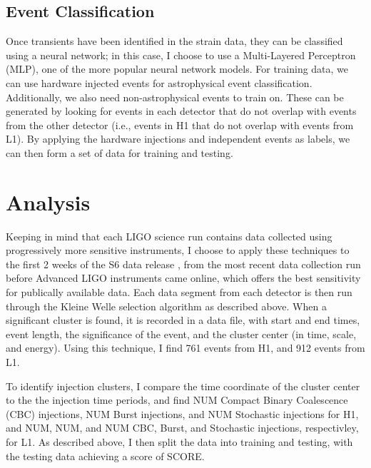 \documentclass{article}
\begin{document}
\subsection{Event Classification}
Once transients have been identified in the strain data, they can be classified using a neural network; in this case, I choose to use a Multi-Layered Perceptron (MLP), one of the more popular neural network models. For training data, we can use hardware injected events for astrophysical event classification. Additionally, we also need non-astrophysical events to train on. These can be generated by looking for events in each detector that do not overlap with events from the other detector (i.e., events in H1 that do not overlap with events from L1). By applying the hardware injections and independent events as labels, we can then form a set of data for training and testing.

\section{Analysis}
Keeping in mind that each LIGO science run contains data collected using progressively more sensitive instruments, I choose to apply these techniques to the first 2 weeks of the S6 data release \cite{LIGOScientificCollaboration2015}, from the most recent data collection run before Advanced LIGO instruments came online, which offers the best sensitivity for publically available data. Each data segment from each detector is then run through the Kleine Welle selection algorithm as described above. When a significant cluster is found, it is recorded in a data file, with start and end times, event length, the significance of the event, and the cluster center (in time, scale, and energy). Using this technique, I find 761 events from H1, and 912 events from L1.

To identify injection clusters, I compare the time coordinate of the cluster center to the the injection time periods, and find NUM Compact Binary Coalescence (CBC) injections, NUM Burst injections, and NUM Stochastic injections for H1, and NUM, NUM, and NUM CBC, Burst, and Stochastic injections, respectivley, for L1. As described above, I then split the data into training and testing, with the testing data achieving a score of SCORE.



\end{document}
